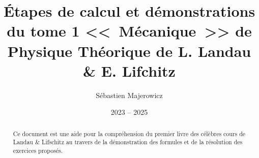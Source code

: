 \documentclass[12pt,a4paper]{report}
\title{\'Etapes de calcul et d\'emonstrations du tome 1 <<~M\'ecanique~>>  de Physique Th\'eorique de L. Landau \&  E. Lifchitz}
\author{S\'ebastien Majerowicz}
\date{2023 -- 2025}
\begin{document}
\maketitle

\begin{abstract}
Ce document est une aide pour la compr\'ehension du premier livre des c\'el\`ebres cours de Landau \& Lifschitz au travers de la d\'emonstration des formules et de la r\'esolution des exercices propos\'es.
\end{abstract}

\tableofcontents
\listoffigures

\clearpage
{}
\setcounter{page}{1}







\appendix






\end{document}

